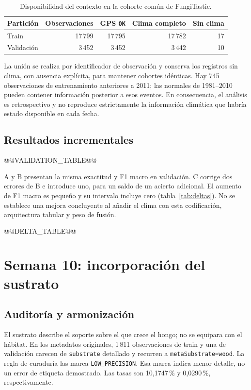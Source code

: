 \documentclass[11pt,a4paper]{article}
\begin{document}
\begin{table}[H]
\centering
\caption{Disponibilidad del contexto en la cohorte común de FungiTastic.}
\label{tab:coverage}
\begin{tabular}{lrrrr}
\toprule
Partición & Observaciones & GPS \texttt{OK} & Clima completo & Sin clima \\
\midrule
Train & 17\,799 & 17\,795 & 17\,782 & 17 \\
Validación & 3\,452 & 3\,452 & 3\,442 & 10 \\
\bottomrule
\end{tabular}
\end{table}

La unión se realiza por identificador de observación y conserva los registros
sin clima, con ausencia explícita, para mantener cohortes idénticas. Hay 745
observaciones de entrenamiento anteriores a 2011; las normales de 1981--2010
pueden contener información posterior a esos eventos. En consecuencia, el
análisis es retrospectivo y no reproduce estrictamente la información
climática que habría estado disponible en cada fecha.

\subsection{Resultados incrementales}
@@VALIDATION_TABLE@@

A y B presentan la misma exactitud y F1 macro en validación. C corrige dos
errores de B e introduce uno, para un saldo de un acierto adicional. El aumento
de F1 macro es pequeño y su intervalo incluye cero
(tabla~\ref{tab:deltas}). No se establece una mejora concluyente al añadir el
clima con esta codificación, arquitectura tabular y peso de fusión.

@@DELTA_TABLE@@

\section{Semana 10: incorporación del sustrato}
\subsection{Auditoría y armonización}
El sustrato describe el soporte sobre el que crece el hongo; no se equipara
con el hábitat. En los metadatos originales, 1\,811 observaciones de train y
una de validación carecen de \texttt{substrate} detallado y recurren a
\texttt{metaSubstrate=wood}. La regla de curaduría las marca
\texttt{LOW\_PRECISION}. Esa marca indica menor detalle, no un error de
etiqueta demostrado. Las tasas son 10,1747\,\% y 0,0290\,\%, respectivamente.
\end{document}
